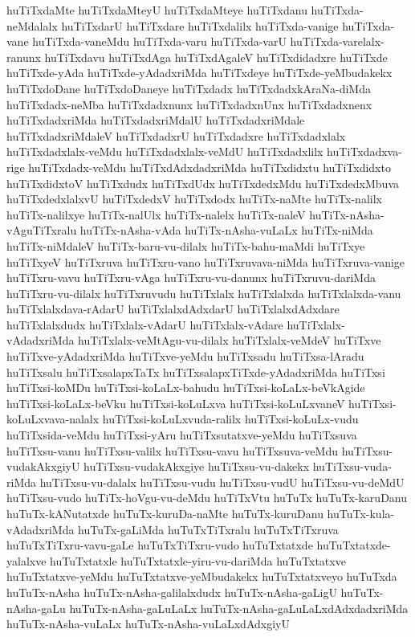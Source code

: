 {huTiTxdaMte
huTiTxdaMteyU
huTiTxdaMteye
huTiTxdanu
huTiTxda-neMdalalx
huTiTxdarU
huTiTxdare
huTiTxdalilx
huTiTxda-vanige
huTiTxda-vane
huTiTxda-vaneMdu
huTiTxda-varu
huTiTxda-varU
huTiTxda-varelalx-ranunx
huTiTxdavu
huTiTxdAga
huTiTxdAgaleV
huTiTxdidadxre
huTiTxde
huTiTxde-yAda
huTiTxde-yAdadxriMda
huTiTxdeye
huTiTxde-yeMbudakekx
huTiTxdoDane
huTiTxdoDaneye
huTiTxdadx
huTiTxdadxkAraNa-diMda
huTiTxdadx-neMba
huTiTxdadxnunx
huTiTxdadxnUnx
huTiTxdadxnenx
huTiTxdadxriMda
huTiTxdadxriMdalU
huTiTxdadxriMdale
huTiTxdadxriMdaleV
huTiTxdadxrU
huTiTxdadxre
huTiTxdadxlalx
huTiTxdadxlalx-veMdu
huTiTxdadxlalx-veMdU
huTiTxdadxlilx
huTiTxdadxva-rige
huTiTxdadx-veMdu
huTiTxdAdxdadxriMda
huTiTxdidxtu
huTiTxdidxto
huTiTxdidxtoV
huTiTxdudx
huTiTxdUdx
huTiTxdedxMdu
huTiTxdedxMbuva
huTiTxdedxlalxvU
huTiTxdedxV
huTiTxdodx
huTiTx-naMte
huTiTx-nalilx
huTiTx-nalilxye
huTiTx-nalUlx
huTiTx-nalelx
huTiTx-naleV
huTiTx-nAsha-vAguTiTxralu
huTiTx-nAsha-vAda
huTiTx-nAsha-vuLaLx
huTiTx-niMda
huTiTx-niMdaleV
huTiTx-baru-vu-dilalx
huTiTx-bahu-maMdi
huTiTxye
huTiTxyeV
huTiTxruva
huTiTxru-vano
huTiTxruvava-niMda
huTiTxruva-vanige
huTiTxru-vavu
huTiTxru-vAga
huTiTxru-vu-danunx
huTiTxruvu-dariMda
huTiTxru-vu-dilalx
huTiTxruvudu
huTiTxlalx
huTiTxlalxda
huTiTxlalxda-vanu
huTiTxlalxdava-rAdarU
huTiTxlalxdAdxdarU
huTiTxlalxdAdxdare
huTiTxlalxdudx
huTiTxlalx-vAdarU
huTiTxlalx-vAdare
huTiTxlalx-vAdadxriMda
huTiTxlalx-veMtAgu-vu-dilalx
huTiTxlalx-veMdeV
huTiTxve
huTiTxve-yAdadxriMda
huTiTxve-yeMdu
huTiTxsadu
huTiTxsa-lAradu
huTiTxsalu
huTiTxsalapxTaTx
huTiTxsalapxTiTxde-yAdadxriMda
huTiTxsi
huTiTxsi-koMDu
huTiTxsi-koLaLx-bahudu
huTiTxsi-koLaLx-beVkAgide
huTiTxsi-koLaLx-beVku
huTiTxsi-koLuLxva
huTiTxsi-koLuLxvaneV
huTiTxsi-koLuLxvava-nalalx
huTiTxsi-koLuLxvuda-ralilx
huTiTxsi-koLuLx-vudu
huTiTxsida-veMdu
huTiTxsi-yAru
huTiTxsutatxve-yeMdu
huTiTxsuva
huTiTxsu-vanu
huTiTxsu-valilx
huTiTxsu-vavu
huTiTxsuva-veMdu
huTiTxsu-vudakAkxgiyU
huTiTxsu-vudakAkxgiye
huTiTxsu-vu-dakekx
huTiTxsu-vuda-riMda
huTiTxsu-vu-dalalx
huTiTxsu-vudu
huTiTxsu-vudU
huTiTxsu-vu-deMdU
huTiTxsu-vudo
huTiTx-hoVgu-vu-deMdu
huTiTxVtu
huTuTx
huTuTx-karuDanu
huTuTx-kANutatxde
huTuTx-kuruDa-naMte
huTuTx-kuruDanu
huTuTx-kula-vAdadxriMda
huTuTx-gaLiMda
huTuTxTiTxralu
huTuTxTiTxruva
huTuTxTiTxru-vavu-gaLe
huTuTxTiTxru-vudo
huTuTxtatxde
huTuTxtatxde-yalalxve
huTuTxtatxle
huTuTxtatxle-yiru-vu-dariMda
huTuTxtatxve
huTuTxtatxve-yeMdu
huTuTxtatxve-yeMbudakekx
huTuTxtatxveyo
huTuTxda
huTuTx-nAsha
huTuTx-nAsha-galilalxdudx
huTuTx-nAsha-gaLigU
huTuTx-nAsha-gaLu
huTuTx-nAsha-gaLuLaLx
huTuTx-nAsha-gaLuLaLxdAdxdadxriMda
huTuTx-nAsha-vuLaLx
huTuTx-nAsha-vuLaLxdAdxgiyU
}
